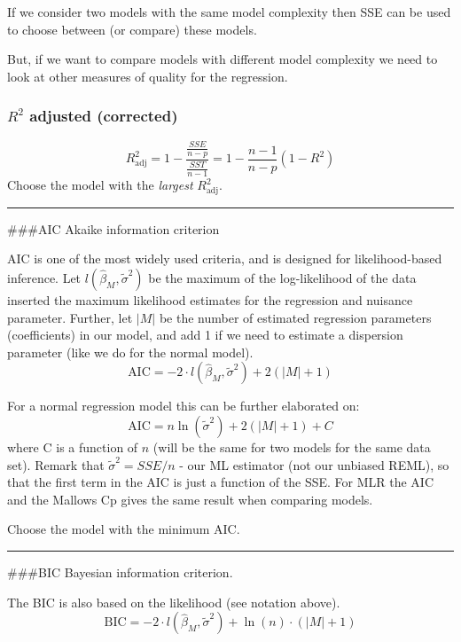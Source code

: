 \documentclass[
]{article}
\begin{document}
If we consider two models with the same model complexity then SSE can be
used to choose between (or compare) these models.

But, if we want to compare models with different model complexity we
need to look at other measures of quality for the regression.

\hypertarget{r2-adjusted-corrected}{%
\subsubsection{\texorpdfstring{\(R^2\) adjusted
(corrected)}{R\^{}2 adjusted (corrected)}}\label{r2-adjusted-corrected}}

\[R^2_{\text{adj}}=1-\frac{\frac{SSE}{n-p}}{\frac{SST}{n-1}}=1-\frac{n-1}{n-p}(1-R^2)\]
Choose the model with the \emph{largest} \(R^2_{\text{adj}}\).

\begin{center}\rule{0.5\linewidth}{0.5pt}\end{center}

\#\#\#AIC Akaike information criterion

AIC is one of the most widely used criteria, and is designed for
likelihood-based inference. Let \(l(\hat{\beta}_M,\tilde{\sigma}^2)\) be
the maximum of the log-likelihood of the data inserted the maximum
likelihood estimates for the regression and nuisance parameter. Further,
let \(\lvert M \rvert\) be the number of estimated regression parameters
(coefficients) in our model, and add 1 if we need to estimate a
dispersion parameter (like we do for the normal model).
\[\text{AIC} =-2 \cdot l(\hat{\beta}_M,\tilde{\sigma}^2)+2(\lvert M\rvert +1)\]

For a normal regression model this can be further elaborated on:
\[\text{AIC} =n\ln(\tilde{\sigma}^2)+2(\lvert M\rvert +1)+C\] where C is
a function of \(n\) (will be the same for two models for the same data
set). Remark that \(\tilde{\sigma}^2=SSE/n\) - our ML estimator (not our
unbiased REML), so that the first term in the AIC is just a function of
the SSE. For MLR the AIC and the Mallows Cp gives the same result when
comparing models.

Choose the model with the minimum AIC.

\begin{center}\rule{0.5\linewidth}{0.5pt}\end{center}

\#\#\#BIC Bayesian information criterion.

The BIC is also based on the likelihood (see notation above).
\[\text{BIC} =-2 \cdot l(\hat{\beta}_M,\tilde{\sigma}^2)+\ln(n)\cdot (\lvert M\rvert +1)\]
\end{document}
